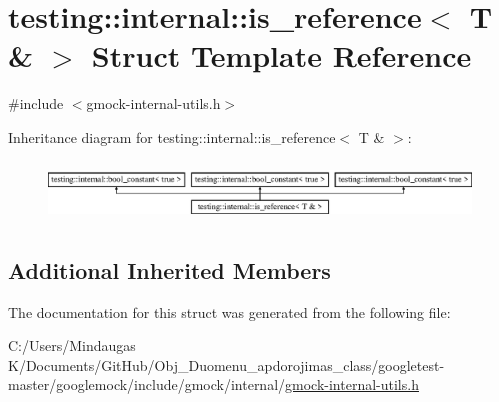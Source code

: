 \hypertarget{structtesting_1_1internal_1_1is__reference_3_01_t_01_6_01_4}{}\section{testing\+::internal\+::is\+\_\+reference$<$ T \& $>$ Struct Template Reference}
\label{structtesting_1_1internal_1_1is__reference_3_01_t_01_6_01_4}


{\ttfamily \#include $<$gmock-\/internal-\/utils.\+h$>$}

Inheritance diagram for testing\+::internal\+::is\+\_\+reference$<$ T \& $>$\+:\begin{figure}[H]
\begin{center}
\leavevmode
\includegraphics[height=1.595442cm]{dd/da8/structtesting_1_1internal_1_1is__reference_3_01_t_01_6_01_4}
\end{center}
\end{figure}
\subsection*{Additional Inherited Members}


The documentation for this struct was generated from the following file\+:\begin{DoxyCompactItemize}
\item 
C\+:/\+Users/\+Mindaugas K/\+Documents/\+Git\+Hub/\+Obj\+\_\+\+Duomenu\+\_\+apdorojimas\+\_\+class/googletest-\/master/googlemock/include/gmock/internal/\mbox{\hyperlink{googletest-master_2googlemock_2include_2gmock_2internal_2gmock-internal-utils_8h}{gmock-\/internal-\/utils.\+h}}\end{DoxyCompactItemize}
